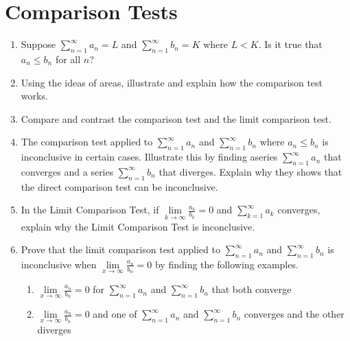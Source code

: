 \section{Comparison Tests}
\begin{enumerate}
\item Suppose $
\displaystyle\sum\limits_{n = 1}^\infty  {a_n }  = L$ and $\displaystyle\sum\limits_{n = 1}^\infty  {b_n }  = K$ where $L < K$.  Is it true that $a_n  \le b_n $ for all $n$?

\item Using the ideas of areas, illustrate and explain how the comparison test works.

\item Compare and contrast the comparison test and the limit comparison test.

\item The comparison test applied to $\displaystyle\sum\limits_{n = 1}^\infty  {a_n } $ and $\displaystyle\sum\limits_{n = 1}^\infty  {b_n } $ where $a_n  \le b_n $ is inconclusive in certain cases.  Illustrate this by finding aseries $\displaystyle\sum\limits_{n = 1}^\infty  {a_n } $ that converges and a series $\displaystyle\sum\limits_{n = 1}^\infty  {b_n } $ that diverges.  Explain why they shows that the direct comparison test can be inconclusive.

\item In the Limit Comparison Test, if $
\mathop {\lim }\limits_{k \to \infty } \frac{{a_k }}{{b_k }} = 0$ and $\displaystyle\sum\limits_{k = 1}^\infty  {a_k } $ converges, explain why the Limit Comparison Test is inconclusive.  \cite{SM}

\item Prove that the limit comparison test applied to $
\displaystyle\sum\limits_{n = 1}^\infty  {a_n } $ and $
\displaystyle\sum\limits_{n = 1}^\infty  {b_n } $
 is inconclusive when $
\mathop {\lim }\limits_{x \to \infty } \frac{{a_n }}{{b_n }} = 0$
 by finding the following examples.
\begin{enumerate}
\item $\mathop {\lim }\limits_{x \to \infty } \frac{{a_n }}{{b_n }} = 0$ for $\displaystyle\sum\limits_{n = 1}^\infty  {a_n } $ and $\displaystyle\sum\limits_{n = 1}^\infty  {b_n } $ that both converge

\item $\mathop {\lim }\limits_{x \to \infty } \frac{{a_n }}{{b_n }} = 0$ and one of $
\displaystyle\sum\limits_{n = 1}^\infty  {a_n } $ and $
\displaystyle\sum\limits_{n = 1}^\infty  {b_n } $ converges and the other diverges



\end{enumerate}
\end{enumerate}
